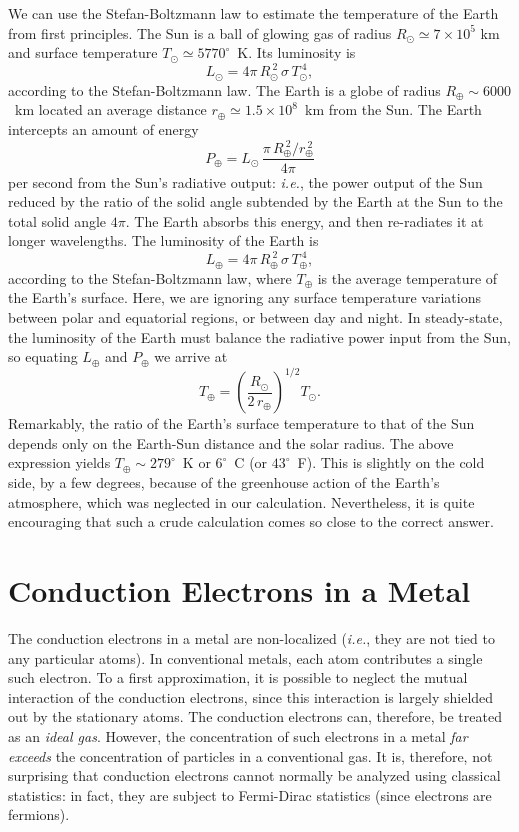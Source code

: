 We can use the Stefan-Boltzmann law to estimate the temperature of the Earth
from first principles. The Sun is a ball of glowing gas of radius $R_\odot\simeq
7\times 10^5$ km and surface temperature $T_\odot\simeq 5770^\circ$~K. Its
luminosity is 
\begin{equation}
L_\odot = 4\pi\, R_\odot^{~2} \, \sigma\, T_\odot^{~4},
\end{equation}
according to  the Stefan-Boltzmann law. The Earth is a globe of radius
$R_\oplus\sim 6000$~km located an average distance $r_\oplus\simeq 1.5\times 10^8$~km
from the Sun. The Earth intercepts an amount of energy
\begin{equation}
P_\oplus=L_\odot\,\frac{ \pi \,R_\oplus^{~2}/r_\oplus^{~2}}{4\pi}
\end{equation}
per second from the Sun's radiative output: {\em i.e.}, the power output of the Sun 
reduced by the ratio of the solid angle subtended by the Earth at the Sun to
the total solid angle $4\pi$. The Earth absorbs this energy, and then
re-radiates it at longer wavelengths. The luminosity of the Earth is
\begin{equation}
L_\oplus = 4\pi\, R_\oplus^{~2} \, \sigma\, T_\oplus^{~4},
\end{equation}
according to the Stefan-Boltzmann law,
where $T_\oplus$ is the average temperature of the Earth's surface. 
Here, we are  ignoring
any surface
temperature variations between polar and equatorial regions, or between day
and night. In steady-state, the luminosity of the Earth must balance the radiative
power input from the Sun,
so equating $L_\oplus$ and $P_\oplus$ we arrive at
\begin{equation}
T_\oplus = \left(\frac{R_\odot}{2\,r_\oplus}\right)^{1/2} T_\odot.
\end{equation}
Remarkably, the ratio of the Earth's surface temperature to that of the Sun depends
only on the Earth-Sun distance and the solar radius. The above expression
yields $T_\oplus\sim 279^\circ$~K or $6^\circ$~C (or $43^\circ$~F). This is slightly on the cold side, by a few
degrees, because of the
greenhouse action of the Earth's atmosphere,
which was neglected in our
calculation. Nevertheless, it is quite encouraging that such a crude calculation
comes so close to the correct answer.

\section{Conduction Electrons in a Metal}
The conduction electrons in a metal are non-localized ({\em i.e.}, they are
not tied to any particular atoms). In conventional metals, each atom contributes
a single such electron. To a first approximation, it is possible
to neglect the mutual interaction of the conduction electrons, since this
interaction
is largely shielded out by the stationary atoms. The conduction electrons
can, therefore, be treated as an {\em ideal gas}. However, the concentration of
such  electrons in a metal {\em far exceeds}\/ the concentration of
particles in a conventional gas. It is, therefore, not surprising that 
conduction electrons cannot normally be analyzed using classical statistics:
in fact,  they are subject to Fermi-Dirac statistics
(since electrons are fermions).

